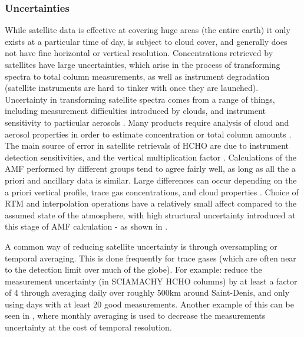     \subsubsection{Uncertainties}
      
      While satellite data is effective at covering huge areas (the entire earth) it only exists at a particular time of day, is subject to cloud cover, and generally does not have fine horizontal or vertical resolution.
      Concentrations retrieved by satellites have large uncertainties, which arise in the process of transforming spectra to total column measurements, as well as instrument degradation (satellite instruments are hard to tinker with once they are launched).
      Uncertainty in transforming satellite spectra comes from a range of things, including measurement difficulties introduced by clouds, and instrument sensitivity to particular aerosols \parencite{Millet2006}.
      Many products require analysis of cloud and aerosol properties in order to estimate concentration or total column amounts \parencite{Palmer2001,Palmer2003, Marais2012, Vasilkov2017}.
      The main source of error in satellite retrievals of HCHO are due to instrument detection sensitivities, and the vertical multiplication factor \parencite{Millet2006}.
      Calculations of the AMF performed by different groups tend to agree fairly well, as long as all the a priori and ancillary data is similar.
      Large differences can occur depending on the a priori vertical profile, trace gas concentrations, and cloud properties \parencite{Lorente2017}.
      Choice of RTM and interpolation operations have a relatively small affect compared to the assumed state of the atmosphere, with high structural uncertainty introduced at this stage of AMF calculation - as shown in \textcite{Lorente2017}.
      
      A common way of reducing satellite uncertainty is through oversampling or temporal averaging.
      This is done frequently for trace gases (which are often near to the detection limit over much of the globe).
      For example: \textcite{Vigouroux2009} reduce the measurement uncertainty (in SCIAMACHY HCHO columns) by at least a factor of 4 through averaging daily over roughly 500km around Saint-Denis, and only using days with at least 20 good measurements.
      Another example of this can be seen in \textcite{Dufour2009}, where monthly averaging is used to decrease the measurements uncertainty at the cost of temporal resolution.
      
